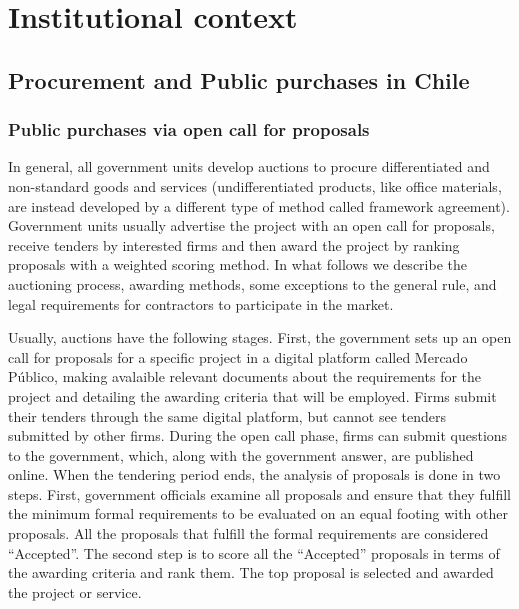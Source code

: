 \chapter{Institutional context}
\section{Procurement and Public purchases in Chile}
\subsection{Public purchases via open call for proposals}
In general, all government units develop auctions to procure differentiated and non-standard goods and services (undifferentiated products, like office materials, are instead developed by a different type of method called framework agreement).  Government units usually advertise the project with an open call for proposals, receive tenders by interested firms and then award the project by ranking proposals with a weighted scoring method. In what follows we describe the auctioning process, awarding methods, some exceptions to the general rule, and legal requirements for contractors to participate in the market.

Usually, auctions have the following stages. First, the government sets up an open call for proposals for a specific project in a digital platform called Mercado Público, making avalaible relevant documents about the requirements for the project and detailing the awarding criteria that will be employed. Firms submit their tenders through the same digital platform, but cannot see tenders submitted by other firms. During the open call phase, firms can submit questions to the government, which, along with the government answer, are published online. When the tendering period ends, the analysis of proposals is done in two steps. First, government officials examine all proposals and ensure that they fulfill the minimum formal requirements to be evaluated on an equal footing with other proposals. All the proposals that fulfill the formal requirements are considered “Accepted”. The second step is to score all the “Accepted” proposals in terms of the awarding criteria and rank them. The top proposal is selected and awarded the project or service.

